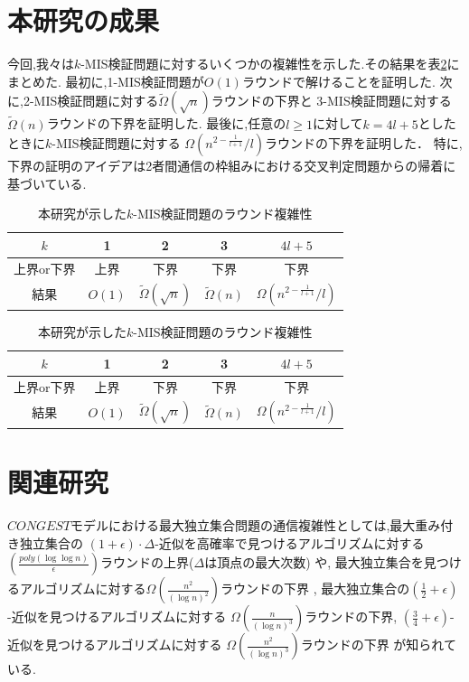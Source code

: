 \documentclass[12pt]{thesis}
\theoremstyle{definition}
\begin{document}
\section{本研究の成果}
今回,我々は$k$-MIS検証問題に対するいくつかの複雑性を示した.その結果を表\ref{tab: k-MIS}にまとめた.
最初に,1-MIS検証問題が$O(1)$ラウンドで解けることを証明した.
次に,2-MIS検証問題に対する$\tilde{\Omega} (\sqrt{n})$ラウンドの下界と
3-MIS検証問題に対する$\tilde{\Omega} (n)$ラウンドの下界を証明した.
最後に,任意の$l \geq 1$に対して$k = 4l + 5$としたときに$k$-MIS検証問題に対する
$\Omega\left(n^{2 - \frac{1}{l+1}}/l\right)$ラウンドの下界を証明した．
特に,下界の証明のアイデアは2者間通信の枠組みにおける交叉判定問題からの帰着に基づいている.

\begin{table}[htb]
  \begin{center}
    \caption{本研究が示した$k$-MIS検証問題のラウンド複雑性}
    \begin{tabular}{|c||c|c|c|c|} \hline
      $k$ & 1 & 2 & 3 & $4l + 5$ \\ \hline
      上界or下界 & 上界 & 下界 & 下界 & 下界 \\ \hline
      結果 & $O(1)$ & $\tilde{\Omega} (\sqrt{n})$ & $\tilde{\Omega} (n)$ & $\Omega\left(n^{2 - \frac{1}{l+1}}/l\right)$ \\ \hline
    \end{tabular}
    \label{tab: k-MIS}
  \end{center}
\end{table}

\begin{table}[htb]
  \begin{center}
    \caption{本研究が示した$k$-MIS検証問題のラウンド複雑性}
    \begin{tabular}{|c||c|c|c|c|} \hline
      $k$ & 1 & 2 & 3 & $4l + 5$ \\ \hline
      上界or下界 & 上界 & 下界 & 下界 & 下界 \\ \hline
      結果 & $O(1)$ & $\tilde{\Omega} (\sqrt{n})$ & $\tilde{\Omega} (n)$ & $\Omega\left(n^{2 - \frac{1}{l+1}}/l\right)$ \\ \hline
    \end{tabular}
    \label{tab: k-MIS}
  \end{center}
\end{table}

\section{関連研究} 
$CONGEST$モデルにおける最大独立集合問題の通信複雑性としては,最大重み付き独立集合の
$(1 + \epsilon) \cdot \Delta$-近似を高確率で見つけるアルゴリズムに対する
$\left(\frac{poly(\log \log n)}{\epsilon}\right)$ラウンドの上界($\Delta$は頂点の最大次数) \cite{kawarabayashi2019improved} や,
最大独立集合を見つけるアルゴリズムに対する$\Omega \left(\frac{n^{2}}{(\log n)^{2}}\right)$ラウンドの下界 \cite{censor2017quadratic},
最大独立集合の$(\frac{1}{2} + \epsilon)$-近似を見つけるアルゴリズムに対する
$\Omega \left(\frac{n}{(\log n)^{3}}\right)$ラウンドの下界,
$(\frac{3}{4} + \epsilon)$-近似を見つけるアルゴリズムに対する
$\Omega \left(\frac{n^{2}}{(\log n)^{3}}\right)$ラウンドの下界 \cite{efron2020beyond} が知られている.
 
\end{document}

